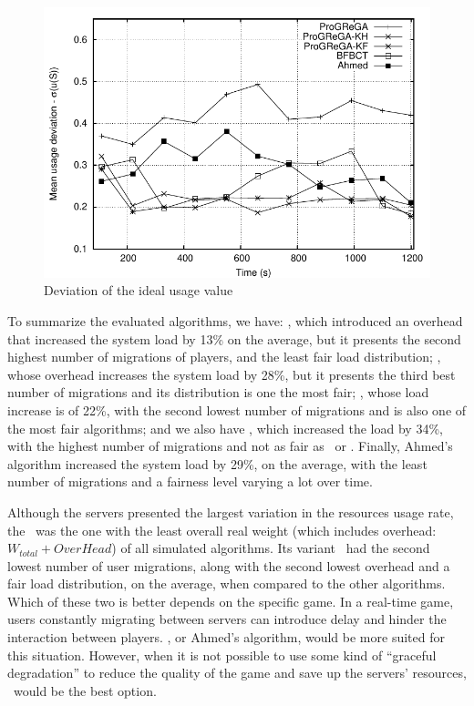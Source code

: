\begin{figure}[!t]
  \centering
  \includegraphics[width=0.75\linewidth]{images/baldeviation_ah}
  \caption{Deviation of the ideal usage value}
  \label{gra:baldeviation}
\end{figure}

To summarize the evaluated algorithms, we have: \ggp, which introduced an overhead that increased the system load by 13\% on the average, but it presents the second highest number of migrations of players, and the least fair load distribution; \ggpk, whose overhead increases the system load by 28\%, but it presents the third best number of migrations and its distribution is one the most fair; \ggpf, whose load increase is of 22\%, with the second lowest number of migrations and is also one of the most fair algorithms; and we also have \bfa, which increased the load by 34\%, with the highest number of migrations and not as fair as \ggpk\ or \ggpf. Finally, Ahmed's algorithm increased the system load by 29\%, on the average, with the least number of migrations and a fairness level varying a lot over time.

Although the servers presented the largest variation in the resources usage rate, the \ggp\ was the one with the least overall real weight (which includes overhead: $W_{total} + OverHead$) of all simulated algorithms. Its variant \ggpf\ had the second lowest number of user migrations, along with the second lowest overhead and a fair load distribution, on the average, when compared to the other algorithms. Which of these two is better depends on the specific game. In a real-time game, users constantly migrating between servers can introduce delay and hinder the interaction between players.  \ggpf, or Ahmed's algorithm, would be more suited for this situation. However, when it is not possible to use some kind of ``graceful degradation'' to reduce the quality of the game and save up the servers' resources, \ggp\ would be the best option.

